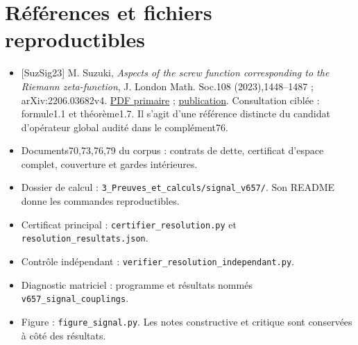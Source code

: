 \documentclass[
  11pt,
]{article}
\providecommand{\tightlist}{%
  \setlength{\itemsep}{0pt}\setlength{\parskip}{0pt}}
\begin{document}
\hypertarget{ruxe9fuxe9rences-et-fichiers-reproductibles}{%
\section{Références et fichiers
reproductibles}\label{ruxe9fuxe9rences-et-fichiers-reproductibles}}

\begin{itemize}
\tightlist
\item
  {[}SuzSig23{]} M. Suzuki, \emph{Aspects of the screw function
  corresponding to the Riemann zeta-function}, J. London Math. Soc.108
  (2023),1448--1487 ; arXiv:2206.03682v4.
  \href{https://arxiv.org/pdf/2206.03682}{PDF primaire} ;
  \href{https://doi.org/10.1112/jlms.12785}{publication}. Consultation
  ciblée : formule1.1 et théorème1.7. Il s'agit d'une référence
  distincte du candidat d'opérateur global audité dans le complément76.
\item
  Documents70,73,76,79 du corpus : contrats de dette, certificat
  d'espace complet, couverture et gardes intérieures.
\item
  Dossier de calcul : \texttt{3\_Preuves\_et\_calculs/signal\_v657/}.
  Son README donne les commandes reproductibles.
\item
  Certificat principal : \texttt{certifier\_resolution.py} et
  \texttt{resolution\_resultats.json}.
\item
  Contrôle indépendant : \texttt{verifier\_resolution\_independant.py}.
\item
  Diagnostic matriciel : programme et résultats nommés
  \texttt{v657\_signal\_couplings}.
\item
  Figure : \texttt{figure\_signal.py}. Les notes constructive et
  critique sont conservées à côté des résultats.
\end{itemize}
\end{document}
